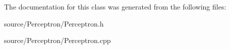 The documentation for this class was generated from the following files\+:\begin{DoxyCompactItemize}
\item 
source/\+Perceptron/Perceptron.\+h\item 
source/\+Perceptron/Perceptron.\+cpp\end{DoxyCompactItemize}
